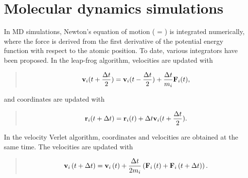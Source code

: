 \documentclass[a4paper,11pt,oneside,english]{sphinxmanual}
\begin{document}
\section{Molecular dynamics simulations}
\label{\detokenize{06_Dynamics:molecular-dynamics-simulations}}
In MD simulations, Newton’s equation of motion ( = ) is integrated numerically,
where the force  is derived from the first derivative of the potential energy function
with respect to the atomic position.
To date, various integrators have been proposed.
In the leap-frog algorithm, velocities are updated with
\begin{quote}

\vspace{-5mm}
\begin{equation*}
\begin{split}{{\bf{v}}_i}(t + \frac{{\Delta t}}{2}) = {{\bf{v}}_i}(t - \frac{{\Delta t}}{2}) + \frac{{\Delta t}}{{{m_i}}}{{\bf{F}}_i}(t),\end{split}
\end{equation*}
\vspace{-3mm}
\end{quote}

and coordinates are updated with
\begin{quote}

\vspace{-5mm}
\begin{equation*}
\begin{split}{{\bf{r}}_i}(t + \Delta t) = {{\bf{r}}_i}(t) + \Delta t{{\bf{v}}_i}(t + \frac{{\Delta t}}{2}).\end{split}
\end{equation*}
\vspace{-3mm}
\end{quote}

In the velocity Verlet algorithm, coordinates and velocities are obtained at the same time.
The velocities are updated with
\begin{quote}

\vspace{-5mm}
\begin{equation*}
\begin{split}{{\bf{v}}_i}\left( t + \Delta t \right) = {{\bf{v}}_i}\left( t \right) + \frac{{\Delta {t}}}{{{2m_i}}}
\left( {{\bf{F}}_i}\left( t \right) + {{\bf{F}}_i}\left( t + {\Delta t} \right) \right).\end{split}
\end{equation*}
\vspace{-3mm}
\end{quote}
\end{document}
